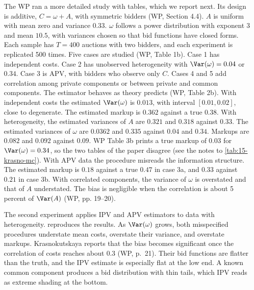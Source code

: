The WP ran a more detailed study with tables, which we report next. Its design is additive,
$C=\omega+A$, with symmetric bidders (WP, Section 4.4). $A$ is
uniform with mean zero and variance $0.33$. $\omega$ follows a power distribution with exponent 3 and
mean $10.5$, with variances chosen so that bid functions have closed forms. Each sample has $T=400$
auctions with two bidders, and each experiment is replicated 500 times. Five cases are studied (WP,
Table 1b). Case 1 has independent costs. Case 2 has unobserved heterogeneity with $\Var(\omega)=0.04$
or $0.34$. Case 3 is APV, with bidders who observe only $C$. Cases 4 and 5 add correlation among
private components or between private and common components.
The estimator behaves as theory predicts (WP, Table 2b). With independent costs the estimated
$\Var(\omega)$ is $0.013$, with interval $[0.01,0.02]$, close to degenerate. The estimated markup is
$0.362$ against a true $0.38$. With heterogeneity, the estimated variances of $A$ are $0.321$ and $0.318$
against $0.33$. The estimated variances of $\omega$ are $0.0362$ and $0.335$ against $0.04$ and $0.34$.
Markups are $0.082$ and $0.092$ against $0.09$. WP Table 3b prints a true markup of $0.03$ for
$\Var(\omega)=0.34$, so the two tables of the paper disagree (see the notes to
\cref{tab:15-krasno-mc}). With APV data the procedure misreads the information
structure. The estimated markup is $0.18$ against a true $0.47$ in case 3a, and $0.33$ against $0.21$
in case 3b. With correlated components, the variance of $\omega$ is overstated and that of $A$
understated. The bias is negligible when the correlation is about 5 percent of $\Var(A)$ (WP, pp.
19--20).

The second experiment applies IPV and APV estimators to data with heterogeneity.
 reproduces the results. As $\Var(\omega)$ grows, both misspecified procedures
understate mean costs, overstate their variance, and overstate markups. Krasnokutskaya reports that the
bias becomes significant once the correlation of costs reaches about $0.3$ (WP, p.~21). Their bid
functions are flatter than the truth, and the IPV estimate is especially flat at the low end. A known
common component produces a bid distribution with thin tails, which IPV reads as extreme shading
at the bottom.

